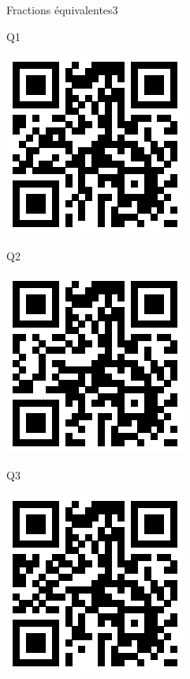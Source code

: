 \documentclass[a4paper,11pt]{report}
\begin{document}
\begin{qmoodle}{Fractions équivalentes}{3}{
	\begin{center}
		Q1

		\includegraphics[scale=1]{img/no3fractions/feq/feq_1}
	\end{center}
	\begin{center}
		Q2

		\includegraphics[scale=1]{img/no3fractions/feq/feq_2}
	\end{center}
	\begin{center}
		Q3

		\includegraphics[scale=1]{img/no3fractions/feq/feq_3}
	\end{center}
}
\end{qmoodle}
\end{document}

